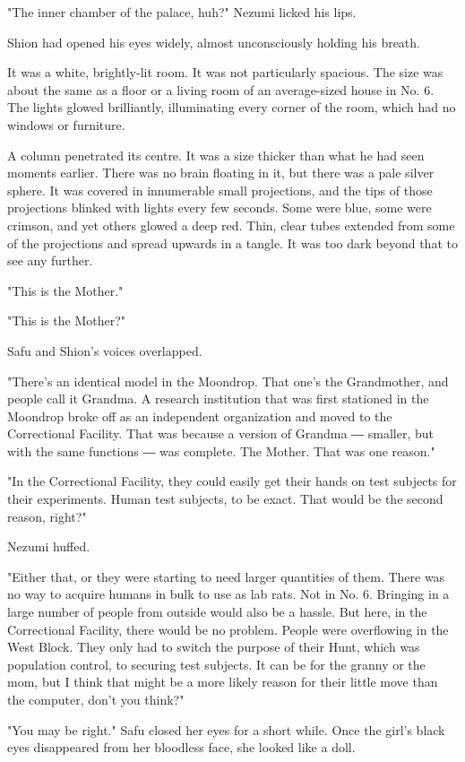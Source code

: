 "The inner chamber of the palace, huh?" Nezumi licked his lips.

Shion had opened his eyes widely, almost unconsciously holding his
breath.

It was a white, brightly-lit room. It was not particularly spacious. The
size was about the same as a floor or a living room of an average-sized
house in No. 6. The lights glowed brilliantly, illuminating every corner
of the room, which had no windows or furniture.

A column penetrated its centre. It was a size thicker than what he had
seen moments earlier. There was no brain floating in it, but there was a
pale silver sphere. It was covered in innumerable small projections, and
the tips of those projections blinked with lights every few seconds.
Some were blue, some were crimson, and yet others glowed a deep red.
Thin, clear tubes extended from some of the projections and spread
upwards in a tangle. It was too dark beyond that to see any further.

"This is the Mother."

"This is the Mother?"

Safu and Shion's voices overlapped.

"There's an identical model in the Moondrop. That one's the Grandmother,
and people call it Grandma. A research institution that was first
stationed in the Moondrop broke off as an independent organization and
moved to the Correctional Facility. That was because a version of
Grandma ― smaller, but with the same functions ― was complete. The
Mother. That was one reason."

"In the Correctional Facility, they could easily get their hands on test
subjects for their experiments. Human test subjects, to be exact. That
would be the second reason, right?"

Nezumi huffed.

"Either that, or they were starting to need larger quantities of them.
There was no way to acquire humans in bulk to use as lab rats. Not in
No. 6. Bringing in a large number of people from outside would also be a
hassle. But here, in the Correctional Facility, there would be no
problem. People were overflowing in the West Block. They only had to
switch the purpose of their Hunt, which was population control, to
securing test subjects. It can be for the granny or the mom, but I think
that might be a more likely reason for their little move than the
computer, don't you think?"

"You may be right." Safu closed her eyes for a short while. Once the
girl's black eyes disappeared from her bloodless face, she looked like a
doll.

